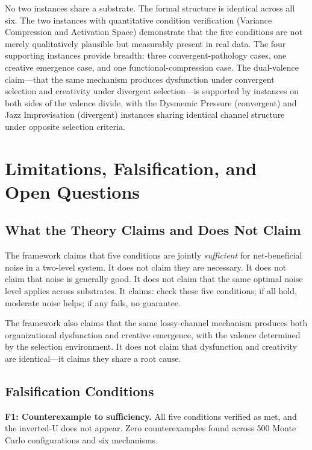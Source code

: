 \documentclass[12pt,letterpaper]{article}
\theoremstyle{definition}
\theoremstyle{remark}
\begin{document}
No two instances share a substrate. The formal structure is identical across all six. The two instances with quantitative condition verification (Variance Compression and Activation Space) demonstrate that the five conditions are not merely qualitatively plausible but measurably present in real data. The four supporting instances provide breadth: three convergent-pathology cases, one creative emergence case, and one functional-compression case. The dual-valence claim---that the same mechanism produces dysfunction under convergent selection and creativity under divergent selection---is supported by instances on both sides of the valence divide, with the Dysmemic Pressure (convergent) and Jazz Improvisation (divergent) instances sharing identical channel structure under opposite selection criteria.


\section{Limitations, Falsification, and Open Questions}

\subsection{What the Theory Claims and Does Not Claim}

The framework claims that five conditions are jointly \emph{sufficient} for net-beneficial noise in a two-level system. It does not claim they are necessary. It does not claim that noise is generally good. It does not claim that the same optimal noise level applies across substrates. It claims: check these five conditions; if all hold, moderate noise helps; if any fails, no guarantee.

The framework also claims that the same lossy-channel mechanism produces both organizational dysfunction and creative emergence, with the valence determined by the selection environment. It does not claim that dysfunction and creativity are identical---it claims they share a root cause.


\subsection{Falsification Conditions}

\textbf{F1: Counterexample to sufficiency.} All five conditions verified as met, and the inverted-U does not appear. Zero counterexamples found across 500 Monte Carlo configurations and six mechanisms.
\end{document}
